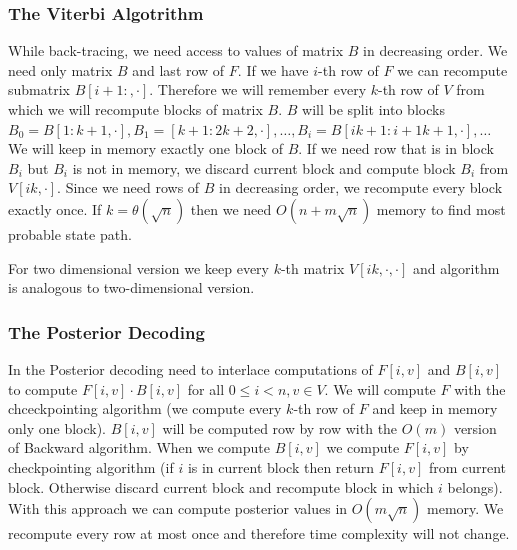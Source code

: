 \subsubsection{The Viterbi Algotrithm}
While back-tracing, we need access to values of matrix $B$ in decreasing order.
We need only matrix $B$ and last row of $F$. If we have $i$-th row of $F$ we can
recompute submatrix $B[i+1:,\cdot]$. Therefore we will remember every $k$-th row
of $V$ from which we will recompute blocks of matrix $B$. $B$ will be split into
blocks
$B_0=B[1:k+1,\cdot],B_1=[k+1:2k+2,\cdot],\dots,B_i=B[ik+1:{i+1}k+1,\cdot],\dots$
We will keep in memory exactly one block of $B$. If we need row that is in block
$B_i$ but $B_i$ is not in memory, we discard current block and compute block
$B_i$ from $V[ik,\cdot]$. Since we need rows of $B$ in decreasing order, we
recompute every block exactly once. If $k=\theta(\sqrt n)$ then we need
$O(n+m\sqrt n)$ memory to find most probable state path.

For two dimensional version we keep every $k$-th matrix $V[ik,\cdot,\cdot]$ and
algorithm is analogous to two-dimensional version.

\subsubsection{The Posterior Decoding}

In the Posterior decoding need to interlace computations of $F[i,v]$ and
$B[i,v]$ to compute $F[i,v]\cdot B[i,v]$ for all $0\leq i<n,v\in V$. We will
compute $F$ with the chceckpointing algorithm (we compute every $k$-th row of
$F$ and keep in memory only one block).  $B[i,v]$ will be computed row by row
with the $O(m)$ version of Backward algorithm. When we compute $B[i,v]$ we
compute $F[i,v]$ by checkpointing algorithm (if $i$ is in current block then
return $F[i,v]$ from current block. Otherwise discard current block and
recompute block in which $i$ belongs). With this approach we can compute
posterior values in $O(m\sqrt n)$ memory. We recompute every row at most once
and therefore time complexity will not change.


%

